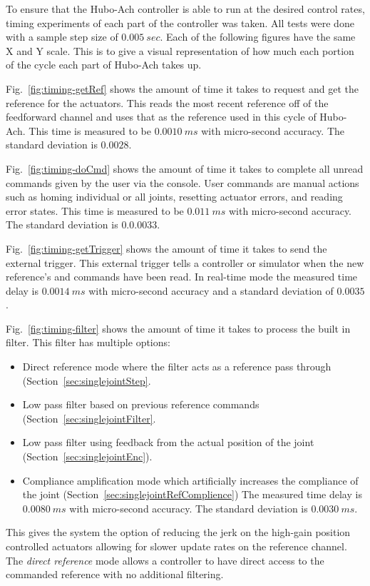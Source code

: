 
To ensure that the Hubo-Ach controller is able to run at the desired control rates, timing experiments of each part of the controller was taken.
All tests were done with a sample step size of $0.005~sec$.
Each of the following figures have the same X and Y scale.
This is to give a visual representation of how much each portion of the cycle each part of Hubo-Ach takes up.




Fig.~\ref{fig:timing-getRef} shows the amount of time it takes to request and get the reference for the actuators.
This reads the most recent reference off of the feedforward channel and uses that as the reference used in this cycle of Hubo-Ach.
This time is measured to be $0.0010~ms$ with micro-second accuracy.
The standard deviation is $0.0028$.



Fig.~\ref{fig:timing-doCmd} shows the amount of time it takes to complete all unread commands given by the user via the console.
User commands are manual actions such as homing individual or all joints, resetting actuator errors, and reading error states.
This time is measured to be $0.011~ms$ with micro-second accuracy.
The standard deviation is $0.0.0033$.


Fig.~\ref{fig:timing-getTrigger} shows the amount of time it takes to send the external trigger.  
This external trigger tells a controller or simulator when the new reference's and commands have been read.
In real-time mode the measured time delay is $0.0014~ms$ with micro-second accuracy and a standard deviation of $0.0035$.


Fig.~\ref{fig:timing-filter} shows the amount of time it takes to process the built in filter.
This filter has multiple options:
\begin{itemize}
\item Direct reference mode where the filter acts as a reference pass through (Section~\ref{sec:singlejointStep}.
\item Low pass filter based on previous reference commands (Section~\ref{sec:singlejointFilter}.
\item Low pass filter using feedback from the actual position of the joint (Section~\ref{sec:singlejointEnc}).
\item Compliance amplification mode which artificially increases the compliance of the joint (Section~\ref{sec:singlejointRefComplience})
The measured time delay is $0.0080~ms$ with micro-second accuracy.
The standard deviation is $0.0030~ms$.
\end{itemize}
This gives the system the option of reducing the jerk on the high-gain position controlled actuators allowing for slower update rates on the reference channel.
The \textit{direct reference} mode allows a controller to have direct access to the commanded reference with no additional filtering.





